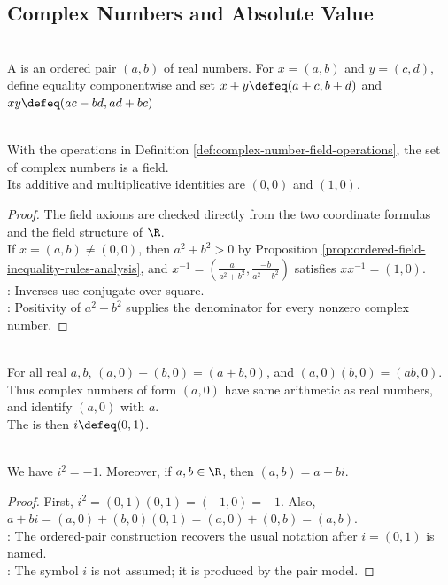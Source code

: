 \subsection{Complex Numbers and Absolute Value}

\begin{definition} \label{def:complex-number-field-operations} \\
A  is an ordered pair $(a,b)$ of real numbers. For $x=(a,b)$ and $y=(c,d)$, define equality componentwise and set $x+y\defeq(a+c,b+d)$ and $xy\defeq(ac-bd,ad+bc)$
\end{definition}

\begin{theorem} \label{thm:complex-numbers-form-field} \\
With the operations in Definition \ref{def:complex-number-field-operations}, the set of complex numbers is a field.\\
Its additive and multiplicative identities are $(0,0)$ and $(1,0)$.
\begin{proof}
The field axioms are checked directly from the two coordinate formulas and the field structure of $\R$.\\
If $x=(a,b)\neq(0,0)$, then $a^2+b^2>0$ by Proposition \ref{prop:ordered-field-inequality-rules-analysis}, and $x^{-1}=\left(\frac{a}{a^2+b^2},\frac{-b}{a^2+b^2}\right)$ satisfies $xx^{-1}=(1,0)$.\\
: Inverses use conjugate-over-square.\\
: Positivity of $a^2+b^2$ supplies the denominator for every nonzero complex number.
\end{proof}
\end{theorem}

\begin{proposition} \label{prop:real-field-embedded-in-complex-field} \\
For all real $a,b$, $(a,0)+(b,0)=(a+b,0)$, and $(a,0)(b,0)=(ab,0)$.\\
Thus complex numbers of form $(a,0)$ have same arithmetic as real numbers, and identify $(a,0)$ with $a$.\\
The  is then $i\defeq(0,1)$.
\end{proposition}

\begin{proposition} \label{prop:complex-unit-and-coordinate-form} \\
We have $i^2=-1$. Moreover, if $a,b\in\R$, then $(a,b)=a+bi$.
\begin{proof}
First, $i^2=(0,1)(0,1)=(-1,0)=-1$. Also, $a+bi=(a,0)+(b,0)(0,1)=(a,0)+(0,b)=(a,b)$.\\
: The ordered-pair construction recovers the usual notation after $i=(0,1)$ is named.\\
: The symbol $i$ is not assumed; it is produced by the pair model.
\end{proof}
\end{proposition}

